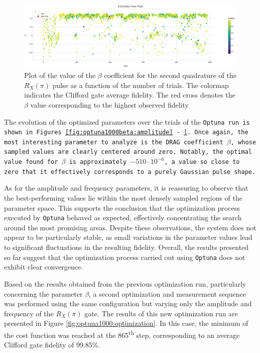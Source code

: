 \begin{figure}[h!]
    \centering
    \includegraphics[width=\textwidth]{figures/png/RB_optimization/Optuna/1000beta/beta.png}
    \caption{Plot of the value of the $\beta$ coefficient for the second quadrature of the $R_X(\pi)$ pulse as a function of the number of trials. 
    The colormap indicates the Clifford gate average fidelity.  
    The red cross denotes the $\beta$ value corresponding to the highest observed fidelity}
    \label{fig:optuna1000beta:beta}
\end{figure}


The evolution of the optimized parameters over the trials of the \tt{Optuna} run is shown in Figures \ref{fig:optuna1000beta:amplitude} - \ref{fig:optuna1000beta:beta}. 
Once again, the most interesting parameter to analyze is the DRAG coefficient $\beta$, whose sampled values are clearly centered around zero. 
Notably, the optimal value found for $\beta$ is approximately $-510 \cdot 10^{-6}$, a value so close to zero that it effectively corresponds to a purely Gaussian pulse shape.

As for the amplitude and frequency parameters, it is reassuring to observe that the best-performing values lie within the most densely sampled regions of the parameter space. 
This supports the conclusion that the optimization process executed by \texttt{Optuna} behaved as expected, effectively concentrating the search around the most promising areas.
Despite these observations, the system does not appear to be particularly stable, as small variations in the parameter values lead to significant fluctuations in the resulting fidelity. 
Overall, the results presented so far suggest that the optimization process carried out using \texttt{Optuna} does not exhibit clear convergence.

Based on the results obtained from the previous optimization run, particularly concerning the parameter $\beta$, a second optimization and measurement sequence was performed using the same configuration but varying only the amplitude and frequency of the $R_X(\pi)$ gate. 
The results of this new optimization run are presented in Figure \ref{fig:optuna1000:optimization}. 
In this case, the minimum of the cost function was reached at the 865\textsuperscript{th} step, corresponding to an average Clifford gate fidelity of 99.85\%.


